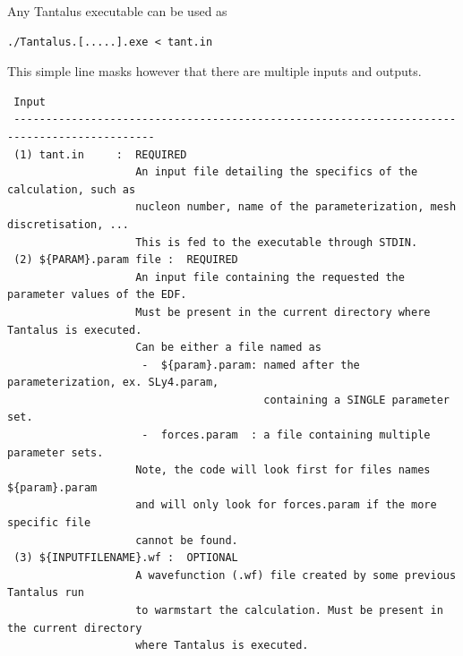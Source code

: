 \documentclass[print,amsmath,amssymb,aps,prc,nofootinbib,notitlepage]{revtex4-1}
\begin{document}
Any Tantalus executable can be used as
%
\begin{verbatim}
./Tantalus.[.....].exe < tant.in  
\end{verbatim}
%
This simple line masks however that there are multiple inputs and outputs.
%
\begin{verbatim}
 Input 
 --------------------------------------------------------------------------------------------
 (1) tant.in     :  REQUIRED
                    An input file detailing the specifics of the calculation, such as 
                    nucleon number, name of the parameterization, mesh discretisation, ... 
                    This is fed to the executable through STDIN.
 (2) ${PARAM}.param file :  REQUIRED
                    An input file containing the requested the parameter values of the EDF. 
                    Must be present in the current directory where Tantalus is executed. 
                    Can be either a file named as
                     -  ${param}.param: named after the parameterization, ex. SLy4.param, 
                                        containing a SINGLE parameter set.
                     -  forces.param  : a file containing multiple parameter sets.
                    Note, the code will look first for files names ${param}.param
                    and will only look for forces.param if the more specific file
                    cannot be found.
 (3) ${INPUTFILENAME}.wf :  OPTIONAL
                    A wavefunction (.wf) file created by some previous Tantalus run
                    to warmstart the calculation. Must be present in the current directory
                    where Tantalus is executed. 


\end{verbatim}
\end{document}
